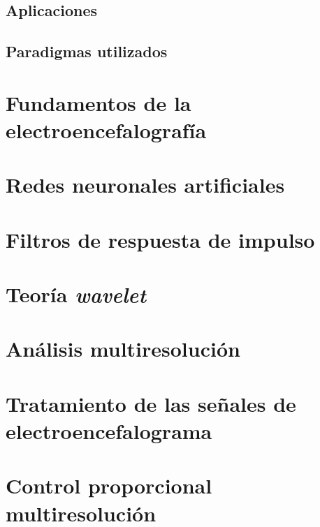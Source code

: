     \subsection{Aplicaciones}
    
    \subsection{Paradigmas utilizados}
    
    
    
\section{Fundamentos de la electroencefalografía}\label{sec:theory eeg fundamentals}

\section{Redes neuronales artificiales}\label{sec:theory rna}

\section{Filtros de respuesta de impulso}\label{sec:theory impulse filters}
    
\section{Teoría \textit{wavelet}}\label{sec:theory wavelet}


\section{Análisis multiresolución}\label{sec:theory multiresolution}

\section{Tratamiento de las señales de electroencefalograma}\label{sec:theory pmr eeg}

\section{Control proporcional multiresolución}\label{sec:theory pmr ctrl}
